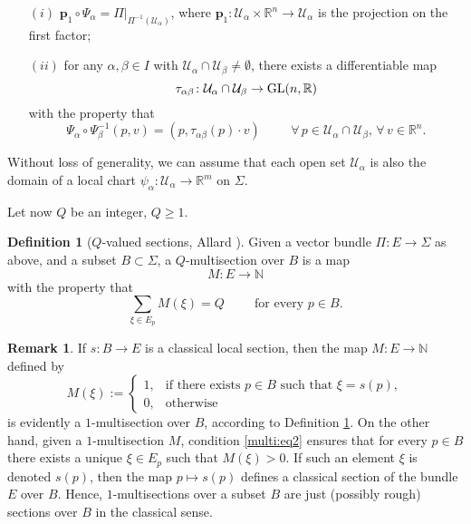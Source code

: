 \documentclass[a4paper,11pt,reqno]{amsart}
\theoremstyle{definition}
\newtheorem{definition}[theorem]{Definition}
\newtheorem{remark}[theorem]{Remark}
\numberwithin{equation}{section}
\numberwithin{subsection}{section}
\newcommand{\N}{\mathbb{N}}
\newcommand{\R}{\mathbb{R}}
\newcommand{\U}{\mathcal{U}}
\newcommand{\p}{\mathbf{p}}
\begin{document}
\begin{itemize}
\item[$(i)$] $\p_{1} \circ \Psi_{\alpha} = \Pi|_{\Pi^{-1}(\U_{\alpha})}$, where $\p_{1} \colon \U_{\alpha} \times \R^n \to \U_{\alpha}$ is the projection on the first factor;

\item[$(ii)$] for any $\alpha, \beta \in I$ with $\U_{\alpha} \cap \U_{\beta} \neq \emptyset$, there exists a differentiable map
\[
\tau_{\alpha\beta} \colon \U_{\alpha} \cap \U_{\beta} \to {\rm GL}(n, \R)
\]
with the property that
\[
\Psi_{\alpha} \circ \Psi_{\beta}^{-1}(p,v) = (p, \tau_{\alpha\beta}(p) \cdot v) \hspace{1cm} \forall \, p \in \U_{\alpha} \cap \U_{\beta}, \, \forall \, v \in \R^{n}.
\]
\end{itemize}

Without loss of generality, we can assume that each open set $\U_{\alpha}$ is also the domain of a local chart $\psi_{\alpha} \colon \U_{\alpha} \to \R^{m}$ on $\Sigma$.

Let now $Q$ be an integer, $Q \geq 1$. 


\begin{definition}[$Q$-valued sections, Allard {\cite{Allard}}] \label{multi:def}
Given a vector bundle $\Pi \colon E \to \Sigma$ as above, and a subset $B \subset \Sigma$, a $Q$-multisection over $B$ is a map
\begin{equation} \label{multi:eq1}
M \colon E \to \N
\end{equation}
with the property that
\begin{equation} \label{multi:eq2}
\sum_{\xi \in E_{p}} M(\xi) = Q \hspace{1cm} \mbox{for every } p \in B.
\end{equation}
\end{definition}

\begin{remark}
If $s \colon B \to E$ is a classical local section, then the map $M \colon E \to \N$ defined by
\begin{equation} \label{1sect}
M(\xi) :=
\begin{cases}
1, & \mbox{if there exists } p \in B \mbox{ such that } \xi = s(p), \\
0, & \mbox{otherwise}
\end{cases}
\end{equation}
is evidently a $1$-multisection over $B$, according to Definition \ref{multi:def}. On the other hand, given a $1$-multisection $M$, condition \eqref{multi:eq2} ensures that for every $p \in B$ there exists a unique $\xi \in E_{p}$ such that $M(\xi) > 0$. If such an element $\xi$ is denoted $s(p)$, then the map $p \mapsto s(p)$ defines a classical section of the bundle $E$ over $B$. Hence, $1$-multisections over a subset $B$ are just (possibly rough) sections over $B$ in the classical sense.
\end{remark}
\end{document}
